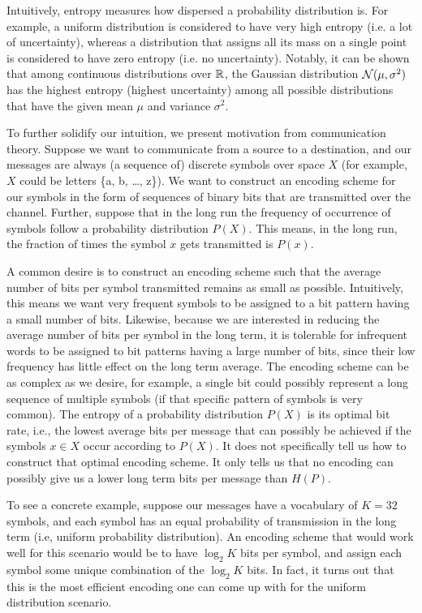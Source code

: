 \documentclass[a4paper]{article}
\begin{document}
Intuitively, entropy measures how dispersed a probability
distribution is. For example, a uniform distribution is
considered to have very high entropy (i.e. a lot of uncertainty),
whereas a distribution that assigns all its mass on a single
point is considered to have zero entropy (i.e. no uncertainty).
Notably, it can be shown that among continuous distributions
over $\mathbb{R}$, the Gaussian distribution $\mathcal{N}(\mu, \sigma^2)$ has
the highest entropy (highest uncertainty) among all possible
distributions that have the given mean $\mu$ and variance $\sigma^2$.

To further solidify our intuition, we present motivation from
communication theory. Suppose we want to communicate from a
source to a destination, and our messages are always
(a sequence of) discrete symbols over space $X$
(for example, $X$ could be letters \{a, b, \dots, z\}).
We want to construct an encoding scheme for our symbols
in the form of sequences of binary bits that are transmitted
over the channel. Further, suppose that in the long run the
frequency of occurrence of symbols follow a probability
distribution $P(X)$. This means, in the long run, the fraction
of times the symbol $x$ gets transmitted is $P(x)$.

A common desire is to construct an encoding scheme such that
the average number of bits per symbol transmitted remains as
small as possible. Intuitively, this means we want very
frequent symbols to be assigned to a bit pattern having a
small number of bits. Likewise, because we are interested in
reducing the average number of bits per symbol in the long
term, it is tolerable for infrequent words to be assigned to
bit patterns having a large number of bits, since their low
frequency has little effect on the long term average. The
encoding scheme can be as complex as we desire, for example,
a single bit could possibly represent a long sequence of
multiple symbols (if that specific pattern of symbols is very
common). The entropy of a probability distribution $P(X)$ is
its optimal bit rate, i.e., the lowest average bits per
message that can possibly be achieved if the symbols $x \in X$
occur according to $P(X)$. It does not specifically tell us
how to construct that optimal encoding scheme. It only tells
us that no encoding can possibly give us a lower long term
bits per message than $H(P)$.

To see a concrete example, suppose our messages have a
vocabulary of $K = 32$ symbols, and each symbol has an equal
probability of transmission in the long term (i.e, uniform
probability distribution). An encoding scheme that would
work well for this scenario would be to have $\log_2 K$ bits
per symbol, and assign each symbol some unique combination
of the $\log_2 K$ bits. In fact, it turns out that this is the
most efficient encoding one can come up with for the uniform
distribution scenario.
\end{document}
